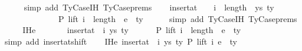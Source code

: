 \begin{isabellebody}
\ \ \ \ \isamarkupfalse%
\ {\isacharparenleft}{\kern0pt}simp\ add{\isacharcolon}{\kern0pt}\ TyCase{\isachardot}{\kern0pt}IH{\isacharparenleft}{\kern0pt}{}{\isacharparenright}{\kern0pt}\ TyCase{\isachardot}{\kern0pt}prems{\isacharparenright}{\kern0pt}\isanewline
\isanewline
\ \ \isamarkupfalse%
\ {\isachardoublequoteopen}insert{\isacharunderscore}{\kern0pt}at\ {\isacharparenleft}{\kern0pt}{\isasymGamma}{}\ {\isacharat}{\kern0pt}\ {\isasymGamma}{\isacharparenright}{\kern0pt}\ {\isacharparenleft}{\kern0pt}i\ {\isacharplus}{\kern0pt}\ length\ {\isasymGamma}{}{\isacharparenright}{\kern0pt}\ {\isacharparenleft}{\kern0pt}ys{\isacharcomma}{\kern0pt}\ ty{}{\isacharparenright}{\kern0pt}\isanewline
\ \ \ \ \ \ \ \ \ \ \ \ \ \ {\isasymturnstile}{\isacharbraceleft}{\kern0pt}P{\isacharbraceright}{\kern0pt}\ lift\ {\isacharparenleft}{\kern0pt}i\ {\isacharplus}{\kern0pt}\ length\ {\isasymGamma}{}{\isacharparenright}{\kern0pt}\ e{}\ {\isacharcolon}{\kern0pt}\ ty{}{\isacharprime}{\kern0pt}{\isachardoublequoteclose}\isanewline
\ \ \ \ \isamarkupfalse%
\ {\isacharparenleft}{\kern0pt}simp\ add{\isacharcolon}{\kern0pt}\ TyCase{\isachardot}{\kern0pt}IH{\isacharparenleft}{\kern0pt}{}{\isacharparenright}{\kern0pt}\ TyCase{\isachardot}{\kern0pt}prems{\isacharparenright}{\kern0pt}\isanewline
\ \ \isamarkupfalse%
\ \isamarkupfalse%
\ IHe{}{\isacharcolon}{\kern0pt}\isanewline
\ \ \ \ \ {\isachardoublequoteopen}{\isasymGamma}{}\ {\isacharat}{\kern0pt}\ insert{\isacharunderscore}{\kern0pt}at\ {\isasymGamma}\ i\ {\isacharparenleft}{\kern0pt}ys{\isacharcomma}{\kern0pt}\ ty{}{\isacharparenright}{\kern0pt}\isanewline
\ \ \ \ \ \ {\isasymturnstile}{\isacharbraceleft}{\kern0pt}P{\isacharbraceright}{\kern0pt}\ lift\ {\isacharparenleft}{\kern0pt}i\ {\isacharplus}{\kern0pt}\ length\ {\isasymGamma}{}{\isacharparenright}{\kern0pt}\ e{}\ {\isacharcolon}{\kern0pt}\ ty{}{\isacharprime}{\kern0pt}{\isachardoublequoteclose}\isanewline
\ \ \ \ \isamarkupfalse%
\ {\isacharparenleft}{\kern0pt}simp\ add{\isacharcolon}{\kern0pt}\ insert{\isacharunderscore}{\kern0pt}at{\isacharunderscore}{\kern0pt}shift{\isacharparenright}{\kern0pt}\isanewline
\isanewline
\ \ \isamarkupfalse%
\ IHe{}{\isacharcolon}{\kern0pt}\ {\isachardoublequoteopen}insert{\isacharunderscore}{\kern0pt}at\ {\isasymGamma}\ i\ {\isacharparenleft}{\kern0pt}ys{\isacharcomma}{\kern0pt}\ ty{}{\isacharparenright}{\kern0pt}\ {\isasymturnstile}{\isacharbraceleft}{\kern0pt}P{\isacharbraceright}{\kern0pt}\ lift\ i\ e{}\ {\isacharcolon}{\kern0pt}\ ty{}{\isacharprime}{\kern0pt}{\isachardoublequoteclose}\isanewline

\end{isabellebody}
